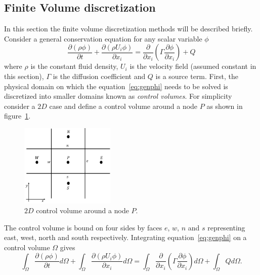 \subsection{Finite Volume discretization}\label{sec:ch2disceqnphi}
In this section the finite volume discretization methods will be described briefly. 
Consider a general conservation equation for any scalar variable $\phi$ 
\begin{equation}
\frac{\partial (\rho \phi)}{\partial t} + \frac{\partial (\rho U_i \phi)}{\partial x_i} = \frac{\partial}{\partial x_i}\left(\Gamma\frac{\partial \phi}{\partial x_i}\right) + Q
\label{eq:genphi}
\end{equation}
where $\rho$ is the constant fluid density, $U_i$ is the velocity field (assumed constant in this section), $\Gamma$ is the diffusion coefficient and $Q$ is a source term. First, the physical domain on which the equation~\ref{eq:genphi} needs to be solved is discretized into smaller domains known as \textit{control volumes}. For simplicity consider a $2D$ case and define a control volume around a node $P$ as shown in figure~\ref{fig:2ddaxis}.
\begin{figure}[h]
\centering
\captionsetup{justification=centering}
 \includegraphics[width=0.4\textwidth]{ch2_litsurvey/Figures/2ddomainwaxisneigh.png}
\caption{$2D$ control volume around a node $P$.}
 \label{fig:2ddaxis}
\end{figure} 

The control volume is bound on four sides by faces $e$, $w$, $n$ and $s$  representing east, west, north and south respectively. Integrating equation~\ref{eq:genphi} on a control volume $\Omega$ gives
\begin{equation}
\int_{\Omega}\frac{\partial (\rho \phi)}{\partial t}d\Omega + \int_{\Omega} \frac{\partial (\rho U_i \phi)}{\partial x_i} d\Omega = \int_{\Omega}\frac{\partial}{\partial x_i}\left(\Gamma\frac{\partial \phi}{\partial x_i}\right) d\Omega + \int_{\Omega} Q d\Omega.
\label{eq:genphidisc}
\end{equation}

